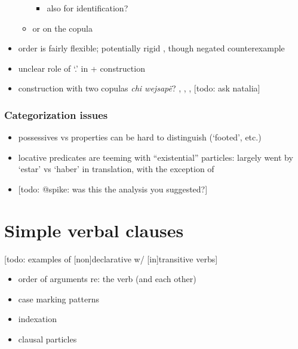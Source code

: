 \documentclass{memoir}
\begin{document}
\begin{itemize}
\begin{itemize}
    \begin{itemize}
    \tightlist
    \item
      also for identification? 
    \end{itemize}
  \item
     or  on the copula
  \end{itemize}
\item
  order is fairly flexible; potentially rigid
  \textsubscript{} \textsubscript{}
  , though negated counterexample 
\item
  unclear role of  `.' in 
  +  construction
\item
  construction with two copulas \emph{chi wejsapë}?
  , ,
  ,  {[}todo: ask natalia{]}
\end{itemize}

\subsection{Categorization issues}

\begin{itemize}
\tightlist
\item
  possessives vs properties can be hard to distinguish (`footed', etc.)
\item
  locative predicates are teeming with ``existential'' particles:
  largely went by `estar' vs `haber' in translation, with the exception
  of 
\item
   {[}todo: @spike: was this the
  analysis you suggested?{]}
\end{itemize}

\chapter{\texorpdfstring{Simple verbal clauses
\label{simpleverb}}{Simple verbal clauses }}

{[}todo: examples of {[}non{]}declarative w/ {[}in{]}transitive verbs{]}

\begin{itemize}
\tightlist
\item
  order of arguments re: the verb (and each other)
\item
  case marking patterns
\item
  indexation
\item
  clausal particles
\end{itemize}
\end{document}

